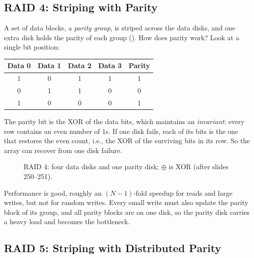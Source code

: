\subsection{RAID 4: Striping with Parity}

A set of data blocks, a \emph{parity group}, is striped across the data disks, and one extra disk holds the parity of each group (). How does parity work? Look at a single bit position:
\begin{center}
\small
\begin{tabular}{cccc|c}
  \toprule
  Data 0 & Data 1 & Data 2 & Data 3 & Parity \\
  \midrule
  1 & 0 & 1 & 1 & 1 \\
  0 & 1 & 1 & 0 & 0 \\
  1 & 0 & 0 & 0 & 1 \\
  \bottomrule
\end{tabular}
\end{center}
The parity bit is the XOR of the data bits, which maintains an \emph{invariant}: every row contains an even number of 1s. If one disk fails, each of its bits is the one that restores the even count, i.e., the XOR of the surviving bits in its row. So the array can recover from one disk failure.

\begin{figure}[H]
\centering
{}
\caption{RAID 4: four data disks and one parity disk; $\oplus$ is XOR (after slides 250--251).}
\label{fig:raid4}
\end{figure}

Performance is good, roughly an $(N-1)$-fold speedup for reads and large writes, but not for random writes. Every small write must also update the parity block of its group, and all parity blocks are on one disk, so the parity disk carries a heavy load and becomes the bottleneck.

\subsection{RAID 5: Striping with Distributed Parity}

